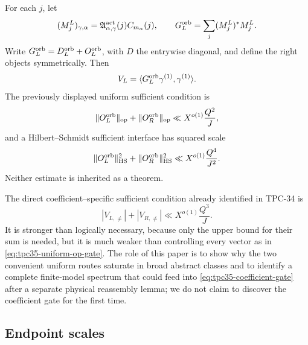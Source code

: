For each \(j\), let
\begin{equation}
 (M_j^L)_{\gamma,\alpha}
 =\mathfrak A_{\alpha,\gamma}^{\rm act}(j)C_{m_\alpha}(j),
 \qquad
 G_L^{\rm orb}=\sum_j(M_j^L)^*M_j^L.
 \label{eq:tpc35-left-Gram}
\end{equation}
Write \(G_L^{\rm orb}=D_L^{\rm orb}+O_L^{\rm orb}\), with \(D\) the
entrywise diagonal, and define the right objects symmetrically.  Then
\begin{equation}
 V_L=\langle G_L^{\rm orb}\gamma^{(1)},\gamma^{(1)}\rangle.
 \label{eq:tpc35-coefficient-Gram}
\end{equation}
The previously displayed uniform sufficient condition is
\begin{equation}
 \|O_L^{\rm orb}\|_{\operatorname{op}}+\|O_R^{\rm orb}\|_{\operatorname{op}}
 \ll X^{o(1)}\frac{Q^2}{J},
 \label{eq:tpc35-uniform-op-gate}
\end{equation}
and a Hilbert--Schmidt sufficient interface has squared scale
\begin{equation}
 \|O_L^{\rm orb}\|_{\operatorname{HS}}^2+\|O_R^{\rm orb}\|_{\operatorname{HS}}^2
 \ll X^{o(1)}\frac{Q^4}{J^2}.
 \label{eq:tpc35-uniform-HS-gate}
\end{equation}
Neither estimate is inherited as a theorem.

The direct coefficient--specific sufficient condition already identified
in TPC-34 is
\begin{equation}
 |V_{L,\ne}|+|V_{R,\ne}|
 \ll X^{o(1)}\frac{Q^3}{J}.
 \label{eq:tpc35-coefficient-gate}
\end{equation}
It is stronger than logically necessary, because only the upper bound for
their sum is needed, but it is much weaker than controlling every vector
as in \eqref{eq:tpc35-uniform-op-gate}.  The role of this paper is to show
why the two convenient uniform routes saturate in broad abstract classes
and to identify a complete finite-model spectrum that could feed into
\eqref{eq:tpc35-coefficient-gate} after a separate physical reassembly
lemma; we do not claim to discover the coefficient gate for the first
time.

\subsection{Endpoint scales}

